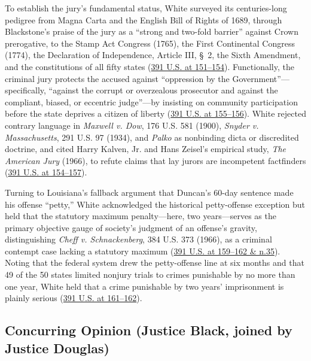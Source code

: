 \documentclass[12pt]{article}
\begin{document}
To establish the jury's fundamental status, White surveyed its centuries-long pedigree from Magna Carta and the English Bill of Rights of 1689, through Blackstone's praise of the jury as a ``strong and two-fold barrier'' against Crown prerogative, to the Stamp Act Congress (1765), the First Continental Congress (1774), the Declaration of Independence, Article III, \S~2, the Sixth Amendment, and the constitutions of all fifty states (\href{https://supreme.justia.com/cases/federal/us/391/145/}{391 U.S. at 151--154}). Functionally, the criminal jury protects the accused against ``oppression by the Government''---specifically, ``against the corrupt or overzealous prosecutor and against the compliant, biased, or eccentric judge''---by insisting on community participation before the state deprives a citizen of liberty (\href{https://supreme.justia.com/cases/federal/us/391/145/}{391 U.S. at 155--156}). White rejected contrary language in \textit{Maxwell v. Dow}, 176 U.S. 581 (1900), \textit{Snyder v. Massachusetts}, 291 U.S. 97 (1934), and \textit{Palko} as nonbinding dicta or discredited doctrine, and cited Harry Kalven, Jr. and Hans Zeisel's empirical study, \textit{The American Jury} (1966), to refute claims that lay jurors are incompetent factfinders (\href{https://supreme.justia.com/cases/federal/us/391/145/}{391 U.S. at 154--157}).

Turning to Louisiana's fallback argument that Duncan's 60-day sentence made his offense ``petty,'' White acknowledged the historical petty-offense exception but held that the statutory maximum penalty---here, two years---serves as the primary objective gauge of society's judgment of an offense's gravity, distinguishing \textit{Cheff v. Schnackenberg}, 384 U.S. 373 (1966), as a criminal contempt case lacking a statutory maximum (\href{https://supreme.justia.com/cases/federal/us/391/145/}{391 U.S. at 159--162 \& n.35}). Noting that the federal system drew the petty-offense line at six months and that 49 of the 50 states limited nonjury trials to crimes punishable by no more than one year, White held that a crime punishable by two years' imprisonment is plainly serious (\href{https://supreme.justia.com/cases/federal/us/391/145/}{391 U.S. at 161--162}).

\subsection{Concurring Opinion (Justice Black, joined by Justice Douglas)}
\end{document}
